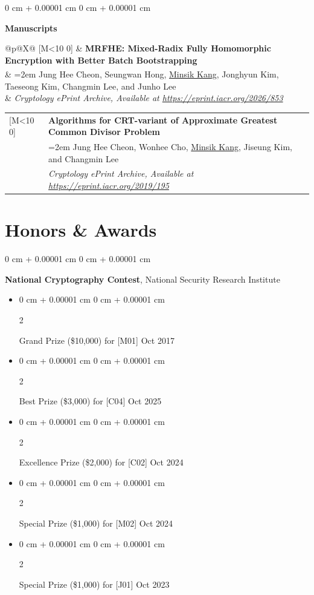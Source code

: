 \documentclass[10pt, letterpaper]{article}
\makeatletter
\newenvironment{highlights}{
    \begin{itemize}[
        topsep=0.10 cm,
        parsep=0.10 cm,
        partopsep=0pt,
        itemsep=0pt,
        leftmargin=0 cm + 10pt
    ]
}{
    \end{itemize}
} %
\newenvironment{onecolentry}{
    \begin{adjustwidth}{
        0 cm + 0.00001 cm
    }{
        0 cm + 0.00001 cm
    }
}{
    \end{adjustwidth}
} %
\newenvironment{twocolentry}[2][]{
    \onecolentry
    \def\secondColumn{#2}
    \setcolumnwidth{\fill, 4.5 cm}
    \begin{paracol}{2}
}{
    \switchcolumn \raggedleft \secondColumn
    \end{paracol}
    \endonecolentry
} %
\DeclareRobustCommand{\me}{\uline{Minsik Kang}}
\newcommand{\corrmark}{\textsuperscript{\textdagger}} %
\newlength{\MLabelW}\settowidth{\MLabelW}{\textbf{[M99]}}
\newcounter{Mctr}
\newcommand{\Mitem}[3]{%
  \noindent\begin{tabularx}{\linewidth}{@{}p{\MLabelW}@{\hspace{0.6em}}X@{}}
    {[M\ifnum\value{Mctr}<10 0\fi\arabic{Mctr}]} &
    \textbf{#1}\\
    & {\hangindent=2em \hangafter=-1 #2}\\
    & \textit{#3}\\
  \end{tabularx}\par
  \addtocounter{Mctr}{-1}\vspace{0.4ex}
}
\makeatother
\begin{document}
        \begin{onecolentry}
            \textbf{Manuscripts}
        \end{onecolentry}
        
        \vspace{0.2 cm}

        \setcounter{Mctr}{2}
        \Mitem{MRFHE: Mixed-Radix Fully Homomorphic Encryption with Better Batch Bootstrapping}{Jung Hee Cheon, Seungwan Hong, \me\corrmark, Jonghyun Kim, Taeseong Kim, Changmin Lee, and Junho Lee}{Cryptology ePrint Archive, Available at \href{https://eprint.iacr.org/2026/853}{https://eprint.iacr.org/2026/853}}
        \Mitem{Algorithms for CRT-variant of Approximate Greatest Common Divisor Problem}
        {Jung Hee Cheon, Wonhee Cho, \me, Jiseung Kim, and Changmin Lee}
        {Cryptology ePrint Archive, Available at \href{https://eprint.iacr.org/2019/195}{https://eprint.iacr.org/2019/195}}

    \section{Honors \& Awards}

    \begin{onecolentry}
        \textbf{National Cryptography Contest}, National Security Research Institute
        \begin{highlights}
            \item \begin{twocolentry}{
            Oct 2017
        }
            Grand Prize (\$10,000) for [M01]\end{twocolentry}
            \item \begin{twocolentry}{
            Oct 2025
        }
            Best Prize (\$3,000) for [C04]\end{twocolentry}
            \item \begin{twocolentry}{
            Oct 2024
        }
            Excellence Prize (\$2,000) for [C02]\end{twocolentry}
            \item \begin{twocolentry}{
            Oct 2024
        }
            Special Prize (\$1,000) for [M02]\end{twocolentry}
            \item \begin{twocolentry}{
            Oct 2023
        }
            Special Prize (\$1,000) for [J01]\end{twocolentry}
        \end{highlights}
    \end{onecolentry}
    \vspace{0.2 cm}
\end{document}
